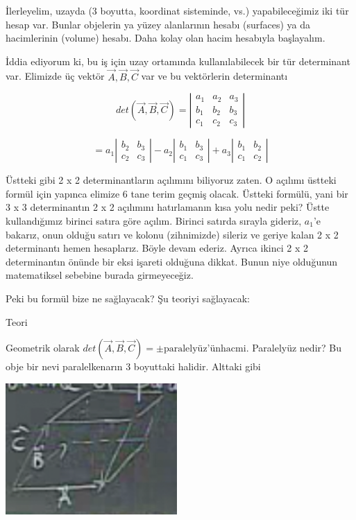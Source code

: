 \documentclass[12pt,fleqn]{article}\usepackage{../../common}
\begin{document}
İlerleyelim, uzayda (3 boyutta, koordinat sisteminde, vs.) yapabileceğimiz iki
tür hesap var. Bunlar objelerin ya yüzey alanlarının hesabı (surfaces) ya da 
hacimlerinin (volume) 
hesabı. Daha kolay olan hacim hesabıyla başlayalım.

İddia ediyorum ki, bu iş için uzay ortamında kullanılabilecek bir tür
determinant var. Elimizde üç vektör $\vec{A},\vec{B},\vec{C}$ var ve 
bu vektörlerin determinantı

$$ det(\vec{A},\vec{B},\vec{C}) = 
\left|\begin{array}{rrr}
a_1 & a_2 & a_3 \\
b_1 & b_2 & b_3 \\
c_1 & c_2 & c_3 
\end{array}\right|
 $$

$$ = 
a_1
\left|\begin{array}{rr}
b_2 & b_3 \\
c_2 & c_3
\end{array}\right|
-
a_2
\left|\begin{array}{rr}
b_1 & b_3 \\
c_1 & c_3
\end{array}\right|
+
a_3
\left|\begin{array}{rr}
b_1 & b_2 \\
c_1 & c_2
\end{array}\right|
$$

Üstteki gibi 2 x 2 determinantların açılımını biliyoruz zaten. O açılımı üstteki
formül için yapınca elimize 6 tane terim geçmiş olacak. Üstteki formülü, yani
bir 3 x 3 determinantın 2 x 2 açılımını hatırlamanın kısa yolu nedir peki? Üstte
kullandığımız birinci satıra göre açılım. Birinci satırda sırayla gideriz,
$a_1$'e bakarız, onun olduğu satırı ve kolonu (zihnimizde) sileriz ve geriye
kalan 2 x 2 determinantı hemen hesaplarız. Böyle devam ederiz. Ayrıca ikinci 2 x
2 determinantın önünde bir eksi işareti olduğuna dikkat. Bunun niye olduğunun
matematiksel sebebine burada girmeyeceğiz.

Peki bu formül bize ne sağlayacak? Şu teoriyi sağlayacak:

Teori

Geometrik olarak $det(\vec{A},\vec{B},\vec{C}) = \pm \textrm{paralelyüz'ünhacmi}$.
Paralelyüz nedir? Bu obje bir nevi paralelkenarın 3 boyuttaki halidir.  Alttaki gibi

\begin{center}
\includegraphics[height=5cm]{2_9.png}
\end{center}
\end{document}

